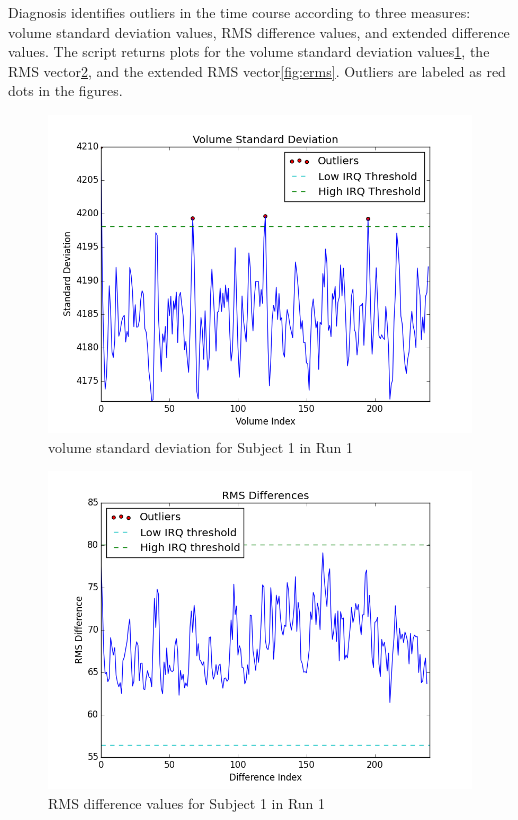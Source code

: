 \par \indent Diagnosis identifies outliers in the time course according to three measures: volume standard deviation values, RMS difference values, and extended difference values. The script returns plots for the volume standard deviation values\ref{fig:vol_std}, the RMS vector\ref{fig:rms}, and the extended RMS vector\ref{fig:erms}. Outliers are labeled as red dots in the figures.

\begin{figure}[h!]
\centering
\includegraphics[width=120mm]{images/vol_std.png}
\caption{volume standard deviation for Subject 1 in Run 1}
\label{fig:vol_std}
\end{figure}

\begin{figure}[h!]
\centering
\includegraphics[width=120mm]{images/vol_rms_outliers.png}
\caption{RMS difference values for Subject 1 in Run 1}
\label{fig:rms}
\end{figure}

